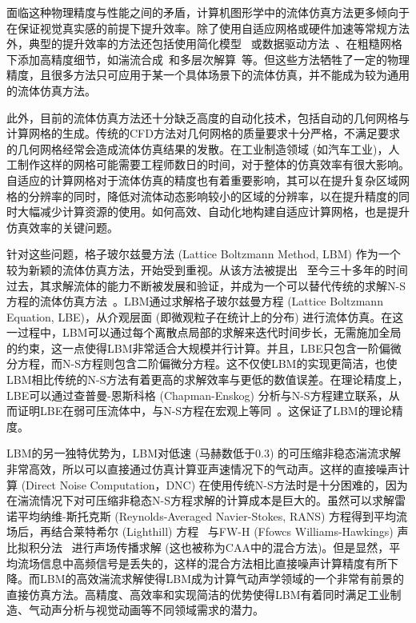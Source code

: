 面临这种物理精度与性能之间的矛盾，计算机图形学中的流体仿真方法更多倾向于在保证视觉真实感的前提下提升效率。除了使用自适应网格或硬件加速等常规方法外，典型的提升效率的方法还包括使用简化模型~\citep{doi.org/10.1111/cgf.12825} 或数据驱动方法~\citep{10.1145/2816795.2818129}、在粗糙网格下添加高精度细节，如湍流合成~\citep{10.1145/1360612.1360649}和多层次解算~\citep{10.1145/1833349.1778785}等。但这些方法牺牲了一定的物理精度，且很多方法只可应用于某一个具体场景下的流体仿真，并不能成为较为通用的流体仿真方法。

此外，目前的流体仿真方法还十分缺乏高度的自动化技术，包括自动的几何网格与计算网格的生成。传统的CFD方法对几何网格的质量要求十分严格，不满足要求的几何网格经常会造成流体仿真结果的发散。在工业制造领域 (如汽车工业)，人工制作这样的网格可能需要工程师数日的时间，对于整体的仿真效率有很大影响。自适应的计算网格对于流体仿真的精度也有着重要影响，其可以在提升复杂区域网格的分辨率的同时，降低对流体动态影响较小的区域的分辨率，以在提升精度的同时大幅减少计算资源的使用。如何高效、自动化地构建自适应计算网格，也是提升仿真效率的关键问题。

针对这些问题，格子玻尔兹曼方法 (Lattice Boltzmann Method, LBM) 作为一个较为新颖的流体仿真方法，开始受到重视。从该方法被提出~\citep{PhysRevLett.61.2332} 至今三十多年的时间过去，其求解流体的能力不断被发展和验证，并成为一个可以替代传统的求解N-S方程的流体仿真方法~\citep{ARUMUGAPERUMAL2015955}。LBM通过求解格子玻尔兹曼方程 (Lattice Boltzmann Equation, LBE)，从介观层面 (即微观粒子在统计上的分布) 进行流体仿真。在这一过程中，LBM可以通过每个离散点局部的求解来迭代时间步长，无需施加全局的约束，这一点使得LBM非常适合大规模并行计算。并且，LBE只包含一阶偏微分方程，而N-S方程则包含二阶偏微分方程。这不仅使LBM的实现更简洁，也使LBM相比传统的N-S方法有着更高的求解效率与更低的数值误差。在理论精度上，LBE可以通过查普曼-恩斯科格 (Chapman-Enskog) 分析与N-S方程建立联系，从而证明LBE在弱可压流体中，与N-S方程在宏观上等同~\citep{Y.H.Qian_1993}。这保证了LBM的理论精度。

LBM的另一独特优势为，LBM对低速 (马赫数低于0.3) 的可压缩非稳态湍流求解非常高效，所以可以直接通过仿真计算亚声速情况下的气动声。这样的直接噪声计算 (Direct Noise Computation，DNC) 在使用传统N-S方法时是十分困难的，因为在湍流情况下对可压缩非稳态N-S方程求解的计算成本是巨大的。虽然可以求解雷诺平均纳维-斯托克斯 (Reynolds-Averaged Navier-Stokes, RANS) 方程得到平均流场后，再结合莱特希尔 (Lighthill) 方程~\citep{doi:10.1098/rspa.1952.0060} 与FW-H (Ffowcs Williams-Hawkings) 声比拟积分法~\citep{doi:10.1098/rsta.1969.0031} 进行声场传播求解 (这也被称为CAA中的混合方法)。但是显然，平均流场信息中高频信号是丢失的，这样的混合方法相比直接噪声计算精度有所下降。而LBM的高效湍流求解使得LBM成为计算气动声学领域的一个非常有前景的直接仿真方法。高精度、高效率和实现简洁的优势使得LBM有着同时满足工业制造、气动声分析与视觉动画等不同领域需求的潜力。

